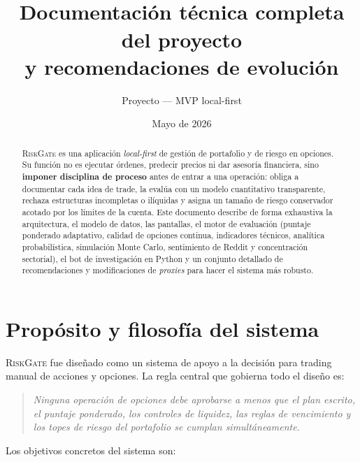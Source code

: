\documentclass[11pt,letterpaper]{article}
\title{\textbf{\RiskGate}\\[2mm]
\large Documentación técnica completa del proyecto\\
y recomendaciones de evolución}
\author{Proyecto \RiskGate{} --- MVP local-first}
\date{Mayo de 2026}
\newcommand{\RiskGate}{\textsc{RiskGate}}
\begin{document}
\maketitle

\begin{abstract}
\noindent
\RiskGate{} es una aplicación \emph{local-first} de gestión de portafolio y de
riesgo en opciones. Su función no es ejecutar órdenes, predecir precios ni dar
asesoría financiera, sino \textbf{imponer disciplina de proceso} antes de
entrar a una operación: obliga a documentar cada idea de trade, la evalúa con un
modelo cuantitativo transparente, rechaza estructuras incompletas o ilíquidas y
asigna un tamaño de riesgo conservador acotado por los límites de la cuenta.
Este documento describe de forma exhaustiva la arquitectura, el modelo de datos,
las pantallas, el motor de evaluación (puntaje ponderado adaptativo, calidad de
opciones continua, indicadores técnicos, analítica probabilística, simulación
Monte Carlo, sentimiento de Reddit y concentración sectorial), el bot de
investigación en Python y un conjunto detallado de recomendaciones y
modificaciones de \emph{proxies} para hacer el sistema más robusto.
\end{abstract}

\tableofcontents
\newpage

\section{Propósito y filosofía del sistema}

\RiskGate{} fue diseñado como un sistema de apoyo a la decisión para trading
manual de acciones y opciones. La regla central que gobierna todo el diseño es:

\begin{quote}
\itshape
Ninguna operación de opciones debe aprobarse a menos que el plan escrito, el
puntaje ponderado, los controles de liquidez, las reglas de vencimiento y los
topes de riesgo del portafolio se cumplan simultáneamente.
\end{quote}

Los objetivos concretos del sistema son:
\end{document}
